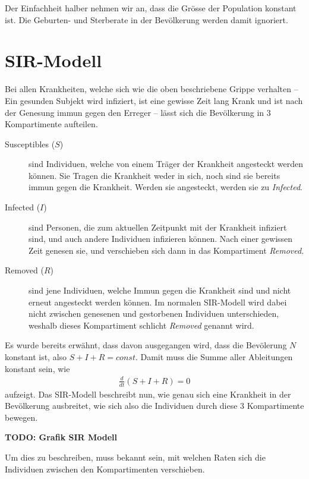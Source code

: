\begin{refsection}
Der Einfachheit halber nehmen wir an, dass die Grösse der Population konstant ist.
Die Geburten- und Sterberate in der Bevölkerung werden damit ignoriert.

\section{SIR-Modell}
Bei allen Krankheiten, welche sich wie die oben beschriebene Grippe verhalten -- Ein gesunden Subjekt wird infiziert, ist eine gewisse Zeit lang Krank und ist nach der Genesung immun gegen den Erreger -- lässt sich die Bevölkerung in 3 Kompartimente aufteilen. 
\begin{description}
  \item [Susceptibles ($S$)] sind Individuen, welche von einem Träger der Krankheit angesteckt werden können. Sie Tragen die Krankheit weder in sich, noch sind sie bereits immun gegen die Krankheit. Werden sie angesteckt, werden sie zu \emph{Infected}.
  \item [Infected ($I$)] sind Personen, die zum aktuellen Zeitpunkt mit der Krankheit infiziert sind, und auch andere Individuen infizieren können. Nach einer gewissen Zeit genesen sie, und verschieben sich dann in das Kompartiment \emph{Removed}.
  \item [Removed ($R$)] sind jene Individuen, welche Immun gegen die Krankheit sind und nicht erneut angesteckt werden können. Im normalen SIR-Modell wird dabei nicht zwischen genesenen und gestorbenen Individuen unterschieden, weshalb dieses Kompartiment schlicht \emph{Removed} genannt wird.
\end{description}

Es wurde bereits erwähnt, dass davon ausgegangen wird, dass die Bevölerung $N$ konstant ist, also $S + I + R = const$. Damit muss die Summe aller Ableitungen konstant sein, wie
\begin{align*}
  \frac{d}{dt}\left(S+I+R\right) = 0
\end{align*}
aufzeigt. Das SIR-Modell beschreibt nun, wie genau sich eine Krankheit in der Bevölkerung ausbreitet, wie sich also die Individuen durch diese 3 Kompartimente bewegen.

\textbf{TODO: Grafik SIR Modell}

Um dies zu beschreiben, muss bekannt sein, mit welchen Raten sich die Individuen zwischen den Kompartimenten verschieben.


\end{refsection}
